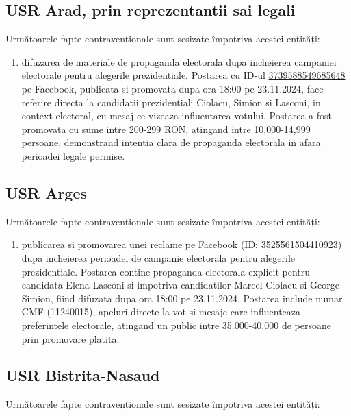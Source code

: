 \documentclass[a4paper,12pt]{article}
\begin{document}
\vspace{0.5cm}

\subsection{USR Arad, prin reprezentantii sai legali}
Următoarele fapte contravenționale sunt sesizate împotriva acestei entități:

\begin{enumerate}[leftmargin=*, label=\arabic*.)]
    \item difuzarea de materiale de propaganda electorala dupa incheierea campaniei electorale pentru alegerile prezidentiale. Postarea cu ID-ul \href{https://www.facebook.com/ads/library/?id=3739588549685648}{3739588549685648} pe Facebook, publicata si promovata dupa ora 18:00 pe 23.11.2024, face referire directa la candidatii prezidentiali Ciolacu, Simion si Lasconi, in context electoral, cu mesaj ce vizeaza influentarea votului. Postarea a fost promovata cu sume intre 200-299 RON, atingand intre 10,000-14,999 persoane, demonstrand intentia clara de propaganda electorala in afara perioadei legale permise.
\end{enumerate}

\vspace{0.5cm}

\subsection{USR Arges}
Următoarele fapte contravenționale sunt sesizate împotriva acestei entități:

\begin{enumerate}[leftmargin=*, label=\arabic*.)]
    \item publicarea si promovarea unei reclame pe Facebook (ID: \href{https://www.facebook.com/ads/library/?id=3525561504410923}{3525561504410923}) dupa incheierea perioadei de campanie electorala pentru alegerile prezidentiale. Postarea contine propaganda electorala explicit pentru candidata Elena Lasconi si impotriva candidatilor Marcel Ciolacu si George Simion, fiind difuzata dupa ora 18:00 pe 23.11.2024. Postarea include numar CMF (11240015), apeluri directe la vot si mesaje care influenteaza preferintele electorale, atingand un public intre 35.000-40.000 de persoane prin promovare platita.
\end{enumerate}

\vspace{0.5cm}

\subsection{USR Bistrita-Nasaud}
Următoarele fapte contravenționale sunt sesizate împotriva acestei entități:
\end{document}
